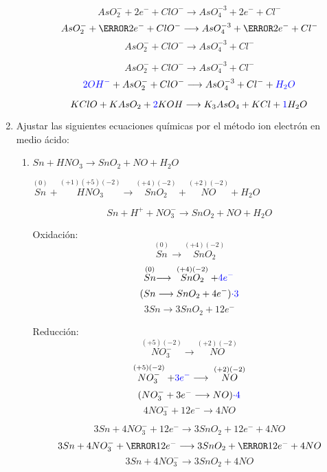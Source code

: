 \documentclass[../Práctica.root.tex]{subfiles}
\newcommand{\lra}{\ensuremath{\longrightarrow{}}}
\newcommand{\sr}[2]{\stackrel{#1}{#2}}
\begin{document}
\begin{enumerate}
\begin{enumerate}
                    \[ AsO_2^- + 2e^- + ClO^- \lra AsO_4^{-3} + 2e^- + Cl^- \]
                    \[ AsO_2^- + \cancel{2e^-} + ClO^- \lra AsO_4^{-3} + \cancel{2e^-} + Cl^- \]
                    \[ AsO_2^- + ClO^- \lra AsO_4^{-3} + Cl^- \]

                    \[ AsO_2^- + ClO^- \lra AsO_4^{-3} + Cl^- \]
                    \[ \blue{2OH^-} + AsO_2^- + ClO^- \lra AsO_4^{-3} + Cl^- + \blue{H_2O} \]

                    \[ KClO + KAsO_2 + \blue{2} KOH \lra K_3AsO_4 + KCl + \blue{1} H_2O \]
          \end{enumerate}

    \item Ajustar las siguientes ecuaciones químicas por el método ion electrón en medio ácido:
          \begin{enumerate}
              \item $Sn + HNO_3 \lra SnO_2 + NO + H_2O$

                    $\sr{(0)}{Sn} + \sr{(+1)(+5)(-2)}{HNO_3} \lra \sr{(+4)(-2)}{SnO_2} + \sr{(+2)(-2)}{NO} + H_2O$

                    \[ Sn + H^+ + NO_3^- \lra SnO_2 + NO + H_2O \]

                    \begin{multicols}{2}
                        Oxidación:
                        \[ \sr{(0)}{Sn} \lra \sr{(+4)(-2)}{SnO_2} \]
                        \[ \sr{(0)}{Sn} \lra \sr{(+4)(-2)}{SnO_2} + \blue{4 e^-} \]
                        \[ (Sn \lra SnO_2 + 4 e^-)\blue{\cdot 3} \]
                        \[ 3 Sn \lra 3 SnO_2 + 12 e^- \]

                        \columnbreak

                        Reducción:
                        \[ \sr{(+5)(-2)}{NO_3^-} \lra \sr{(+2)(-2)}{NO} \]
                        \[ \sr{(+5)(-2)}{NO_3^-} + \blue{3e^-} \lra \sr{(+2)(-2)}{NO} \]
                        \[ (NO_3^- + 3e^- \lra NO)\blue{\cdot 4} \]
                        \[ 4 NO_3^- + 12 e^- \lra 4 NO \]
                    \end{multicols}

                    \[ 3 Sn + 4 NO_3^- + 12 e^- \lra 3 SnO_2 + 12 e^- + 4 NO \]
                    \[ 3 Sn + 4 NO_3^- + \cancel{12 e^-} \lra 3 SnO_2 + \cancel{12 e^-} + 4 NO \]
                    \[ 3 Sn + 4 NO_3^- \lra 3 SnO_2 + 4 NO \]


\end{enumerate}
\end{enumerate}
\end{document}

